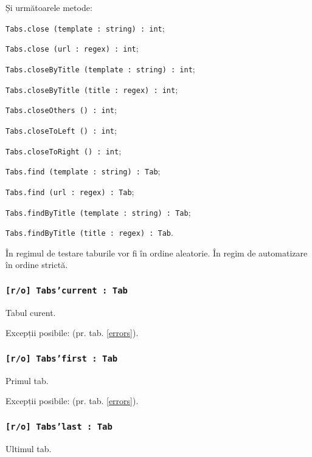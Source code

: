 Și următoarele metode:
\begin{icItems}
	\item \texttt{Tabs.close (template : string) : int};
	\item \texttt{Tabs.close (url : regex) : int};
	\item \texttt{Tabs.closeByTitle (template : string) : int};
	\item \texttt{Tabs.closeByTitle (title : regex) : int};
	\item \texttt{Tabs.closeOthers () : int};
	\item \texttt{Tabs.closeToLeft () : int};
	\item \texttt{Tabs.closeToRight () : int};
	\item \texttt{Tabs.find (template : string) : Tab};
	\item \texttt{Tabs.find (url : regex) : Tab};
	\item \texttt{Tabs.findByTitle (template : string) : Tab};
	\item \texttt{Tabs.findByTitle (title : regex) : Tab}.
\end{icItems}

În regimul de testare taburile vor fi în ordine aleatorie. În regim de automatizare în ordine strictă.

\subsubsection{\texttt{[r/o] Tabs'current : Tab}}

Tabul curent.

Excepții posibile:  (pr. tab. \ref{errors}).

\subsubsection{\texttt{[r/o] Tabs'first : Tab}}

Primul tab.

Excepții posibile:  (pr. tab. \ref{errors}).

\subsubsection{\texttt{[r/o] Tabs'last : Tab}}

Ultimul tab.

